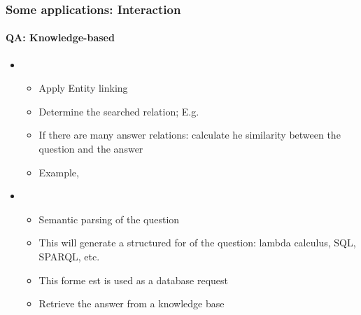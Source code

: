 \documentclass[xcolor=table]{beamer}
\begin{document}
\begin{frame}
	\frametitle{Some applications: Interaction}
	\framesubtitle{QA: Knowledge-based}
	
	\begin{itemize}
		\item {}
		\begin{itemize}
			\item Apply Entity linking
			\item Determine the searched relation; E.g. 
			\item If there are many answer relations: calculate he similarity between the question and the answer
			\item Example, 
		\end{itemize}
		\item {}
		\begin{itemize}
			\item Semantic parsing of the question
			\item This will generate a structured for of the question: lambda calculus, SQL, SPARQL, etc.
			\item This forme est is used as a database request
			\item Retrieve the answer from a knowledge base
		\end{itemize}
	\end{itemize}
	
\end{frame}
\end{document}
